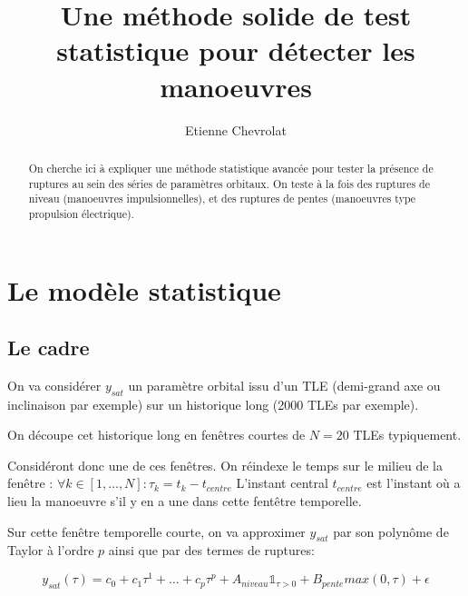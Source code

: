 \documentclass{article}
\title{Une méthode solide de test statistique pour détecter les manoeuvres}
\author{Etienne Chevrolat}
\date{}
\begin{document}
\maketitle

\begin{abstract}
    On cherche ici à expliquer une méthode statistique avancée pour tester la présence de ruptures au sein des séries de paramètres orbitaux.
    On teste à la fois des ruptures de niveau (manoeuvres impulsionnelles), et des ruptures de pentes (manoeuvres type propulsion électrique).
\end{abstract}

\section{Le modèle statistique}

\subsection{Le cadre}

On va considérer $y_{sat}$ un paramètre orbital issu d'un TLE (demi-grand axe ou inclinaison par exemple) sur un historique long (2000 TLEs par exemple).

On découpe cet historique long en fenêtres courtes de $N = 20$ TLEs typiquement. 

Considéront donc une de ces fenêtres. On réindexe le temps sur le milieu de la fenêtre : 
$ 
\forall k \in [1, \dots, N] : \tau_k = t_k - t_{centre}
$
L'instant central $t_{centre}$ est l'instant où a lieu la manoeuvre s'il y en a une dans cette fentêtre temporelle.

Sur cette fenêtre temporelle courte, on va approximer $y_{sat}$ par son polynôme de Taylor à l'ordre $p$ ainsi que par des termes de ruptures: 

$$
y_{sat}(\tau) = c_0 + c_1 \tau ^1 + \dots + c_p \tau ^ p + A_{niveau} \mathbb{1}_{\tau > 0} + B_{pente} max(0, \tau) + \epsilon 
$$

\vspace{0.3cm}
\noindent{}
\end{document}

